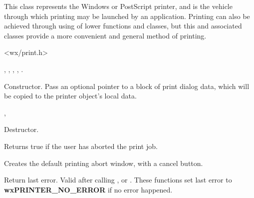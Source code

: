 This class represents the Windows or PostScript printer, and is the vehicle through
which printing may be launched by an application. Printing can also
be achieved through using of lower functions and classes, but
this and associated classes provide a more convenient and general
method of printing.




<wx/print.h>


, , ,\rtfsp
{}, .




Constructor. Pass an optional pointer to a block of print
dialog data, which will be copied to the printer object's local data.


,



Destructor.

\label{wxprinterabort}


Returns true if the user has aborted the print job.

\label{wxprintercreateabortwindow}


Creates the default printing abort window, with a cancel button.


\label{wxprintergetlasterror}


Return last error. Valid after calling ,
 or 
. These functions 
set last error to {\bf wxPRINTER\_NO\_ERROR} if no error happened.

